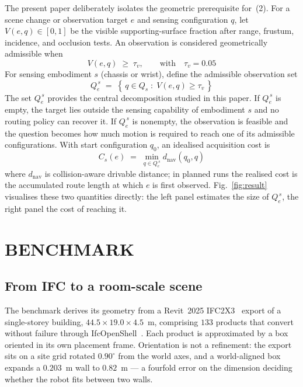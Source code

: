\documentclass[letterpaper, 10 pt, conference]{ieeeconf}
\begin{document}
The present paper deliberately isolates the geometric prerequisite for~(2).
For a scene change or observation target $e$ and sensing configuration $q$, let
$V(e, q) \in [0,1]$ be the visible supporting-surface fraction after range,
frustum, incidence, and occlusion tests. An observation is considered
geometrically admissible when
\begin{equation}
  V(e, q) \;\geq\; \tau_v,
  \qquad \text{with} \quad \tau_v = 0.05
\end{equation}
For sensing embodiment $s$ (chassis or wrist), define the admissible
observation set
\begin{equation}
  Q_e^{\,s} \;=\; \left\{\, q \in Q_s \;:\; V(e,q) \geq \tau_v \,\right\}
\end{equation}
The set $Q_e^{\,s}$ provides the central decomposition studied in this paper.
If $Q_e^{\,s}$ is empty, the target lies outside the sensing capability of
embodiment $s$ and no routing policy can recover it. If $Q_e^{\,s}$ is
nonempty, the observation is feasible and the question becomes how much motion
is required to reach one of its admissible configurations. With start
configuration $q_0$, an idealised acquisition cost is
\begin{equation}
  C_s(e) \;=\; \min_{q \in Q_e^{\,s}} d_{\mathrm{nav}}\!\left(q_0, q\right)
\end{equation}
where $d_{\mathrm{nav}}$ is collision-aware drivable distance; in planned runs
the realised cost is the accumulated route length at which $e$ is first
observed. Fig.~\ref{fig:result} visualises these two quantities directly: the
left panel estimates the size of $Q_e^{\,s}$, the right panel the cost of
reaching it.

\section{BENCHMARK}

\subsection{From IFC to a room-scale scene}

The benchmark derives its geometry from a Revit~2025 IFC2X3~\cite{ifc} export
of a single-storey building, $44.5 \times 19.0 \times 4.5$~m, comprising $133$
products that convert without failure through
IfcOpenShell~\cite{ifcopenshell}. Each product is approximated by a box
oriented in its own placement frame. Orientation is not a refinement: the
export sits on a site grid rotated $0.90^\circ$ from the world axes, and a
world-aligned box expands a $0.203$~m wall to $0.82$~m --- a fourfold error on
the dimension deciding whether the robot fits between two walls.
\end{document}
